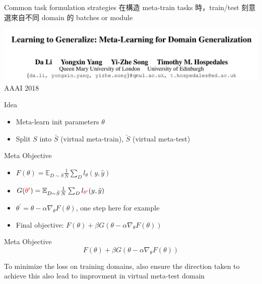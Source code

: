 \documentclass{beamer}
\begin{document}
\begin{frame}{Common task formulation strategies}
  在構造 meta-train tasks 時，train/test 刻意選來自不同 domain 的 batches or module
\end{frame}


\begin{frame}
  \includegraphics[width=\textwidth]{fig/MLDG-title.png}
  \center AAAI 2018
\end{frame}

\begin{frame}[t]{Idea}
  \begin{itemize}
    \item Meta-learn init parameters $\theta$
    \item Split $S$ into $\bar{S}$ (virtual meta-train), $\breve{S}$ (virtual meta-test)
  \end{itemize}

  \vspace{1em}
  \begin{block}{Meta Objective}
    
    \begin{itemize}
      \item $F(\theta) = \mathbb{E}_{D \sim \bar{S}} \frac{1}{N} \sum_{D} l_\theta(y, \hat{y})$
      \item $G({\color{red}{\theta^\prime}}) = \mathbb{E}_{D \sim \breve{S}} \frac{1}{N} \sum_{D} l_{\color{red}{\theta^\prime}} (y, \hat{y})$
      \item $\theta^\prime = \theta - \alpha \nabla_\theta F(\theta)$, one step here for example
      \item Final objective: $F(\theta) + \beta G(\theta - \alpha \nabla_\theta F(\theta))$
    \end{itemize}
  \end{block}
\end{frame}

\begin{frame}{Meta Objective}
  \begin{equation*}
      F(\theta) + \beta G(\theta - \alpha \nabla_\theta F(\theta))
  \end{equation*}

  To minimize the loss on training domains, also ensure the direction taken to achieve this also lead to improvment in virtual meta-test domain
\end{frame}
\end{document}
